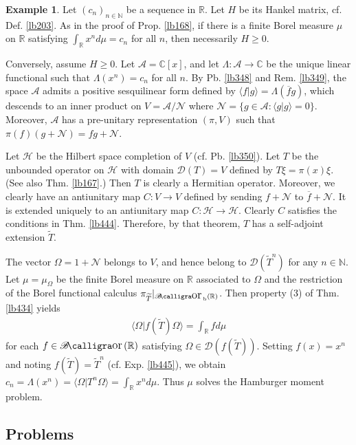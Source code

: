 \documentclass[12pt,b5paper,notitlepage]{article}
\theoremstyle{definition}
\newtheorem{eg}[df]{Example}
\theoremstyle{plain}
\DeclareMathOperator{\Bor}{\mathscr{B}\text{\kern -2pt {\calligra\large or}}\,}
\DeclareMathOperator{\Borb}{{\mathscr{B}\text{\kern -2pt {\calligra\large or}}\,}_{\mathrm b}}
\newcommand{\wtd}{\widetilde}
\newcommand{\ovl}{\overline}
\newcommand{\Dom}{\mathscr{D}}
\newcommand{\bk}[1]{\langle {#1}\rangle}
\newcommand{\scr}{\mathscr}
\newcommand{\Cbb}{\mathbb C}
\newcommand{\Nbb}{\mathbb N}
\newcommand{\Rbb}{\mathbb R}
\newcommand{\MH}{\mathcal H}
\newcommand{\SA}{\mathscr A}
\newcommand{\hqed}{\hfill\qedsymbol}
\numberwithin{equation}{section}
\begin{document}
\begin{eg}\label{lb478}
Let $(c_n)_{n\in\Nbb}$ be a sequence in $\Rbb$. Let $H$ be its Hankel matrix, cf. Def. \ref{lb203}. As in the proof of Prop. \ref{lb168}, if there is a finite Borel measure $\mu$ on $\Rbb$ satisfying $\int_\Rbb x^nd\mu=c_n$ for all $n$, then necessarily $H\geq0$.


Conversely, assume $H\geq0$. Let $\SA=\Cbb[x]$, and let $\Lambda:\SA\rightarrow\Cbb$ be the unique linear functional such that $\Lambda(x^n)=c_n$ for all $n$. By Pb. \ref{lb348} and Rem. \ref{lb349}, the space $\SA$ admits a positive sesquilinear form defined by $\bk{f|g}=\Lambda(\ovl fg)$, which descends to an inner product on $V=\SA/\scr N$ where $\scr N=\{g\in\SA:\bk{g|g}=0\}$. Moreover, $\SA$ has a pre-unitary representation $(\pi,V)$ such that $\pi(f)(g+\scr N)=fg+\scr N$. 

Let $\MH$ be the Hilbert space completion of $V$ (cf. Pb. \ref{lb350}). Let $T$ be the unbounded operator on $\MH$ with domain $\Dom(T)=V$ defined by $T\xi=\pi(x)\xi$. (See also Thm. \ref{lb167}.) Then $T$ is clearly a Hermitian operator. Moreover, we clearly have an antiunitary map $C:V\rightarrow V$ defined by sending $f+\scr N$ to $\ovl f+\scr N$. It is extended uniquely to an antiunitary map $C:\MH\rightarrow\MH$. Clearly $C$ satisfies the conditions in Thm. \ref{lb444}. Therefore, by that theorem, $T$ has a self-adjoint extension $\wtd T$.

The vector $\Omega=1+\scr N$ belongs to $V$, and hence belong to $\Dom(\wtd T^n)$ for any $n\in\Nbb$. Let $\mu=\mu_\Omega$ be the finite Borel measure on $\Rbb$ associated to $\Omega$ and the restriction of the Borel functional calculus $\pi_{\wtd T}|_{\Borb(\Rbb)}$. Then property (3) of Thm. \ref{lb434} yields
\begin{align*}
\bk{\Omega|f(\wtd T)\Omega}=\int_\Rbb fd\mu
\end{align*}
for each $f\in\Bor(\Rbb)$ satisfying $\Omega\in\Dom(f(\wtd T))$. Setting $f(x)=x^n$ and noting $f(\wtd T)=\wtd T^n$ (cf. Exp. \ref{lb445}), we obtain $c_n=\Lambda(x^n)=\bk{\Omega|T^n\Omega}=\int_\Rbb x^nd\mu$. Thus $\mu$ solves the Hamburger moment problem.  \hqed 
\end{eg}






\subsection{Problems}
\end{document}
